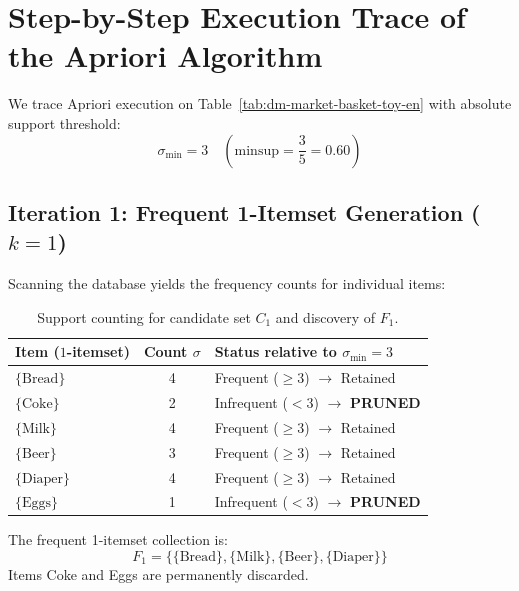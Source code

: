 \section[Step-by-Step Apriori Execution Trace]{Step-by-Step Execution Trace of\\the Apriori Algorithm}
\label{sec:dm-apriori-step-by-step}

We trace Apriori execution on Table~\ref{tab:dm-market-basket-toy-en} with absolute support threshold:
\begin{equation}
\sigma_{\min} = 3 \quad \left(\mathrm{minsup} = \frac{3}{5} = 0.60\right)
\end{equation}

\subsection{Iteration 1: Frequent 1-Itemset Generation ($k=1$)}
Scanning the database yields the frequency counts for individual items:

\begin{table}[htbp]
\centering
\small
\renewcommand{\arraystretch}{1.2}
\begin{tabular}{l c l}
\toprule
\textbf{Item ($1$-itemset)} & \textbf{Count $\sigma$} & \textbf{Status relative to $\sigma_{\min} = 3$} \\
\midrule
$\{\text{Bread}\}$ & 4 & Frequent ($\ge 3$) $\rightarrow$ Retained \\
$\{\text{Coke}\}$ & 2 & Infrequent ($< 3$) $\rightarrow$ \textbf{PRUNED} \\
$\{\text{Milk}\}$ & 4 & Frequent ($\ge 3$) $\rightarrow$ Retained \\
$\{\text{Beer}\}$ & 3 & Frequent ($\ge 3$) $\rightarrow$ Retained \\
$\{\text{Diaper}\}$ & 4 & Frequent ($\ge 3$) $\rightarrow$ Retained \\
$\{\text{Eggs}\}$ & 1 & Infrequent ($< 3$) $\rightarrow$ \textbf{PRUNED} \\
\bottomrule
\end{tabular}
\caption{Support counting for candidate set $C_1$ and discovery of $F_1$.}
\label{tab:dm-apriori-f1-en}
\end{table}

The frequent 1-itemset collection is:
\begin{equation}
F_1 = \{\{\text{Bread}\}, \{\text{Milk}\}, \{\text{Beer}\}, \{\text{Diaper}\}\}
\end{equation}
Items Coke and Eggs are permanently discarded.

